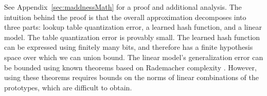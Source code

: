 See Appendix~\ref{sec:maddnessMath} for a proof and additional analysis. The intuition behind the proof is that the overall approximation decomposes into three parts: lookup table quantization error, a learned hash function, and a linear model. The table quantization error is provably small. The learned hash function can be expressed using finitely many bits, and therefore has a finite hypothesis space over which we can union bound. The linear model's generalization error can be bounded using known theorems \cite{kakadeLinear} based on Rademacher complexity \cite{rademacherOrig}. However, using these theorems requires bounds on the norms of linear combinations of the prototypes, which are difficult to obtain. %
